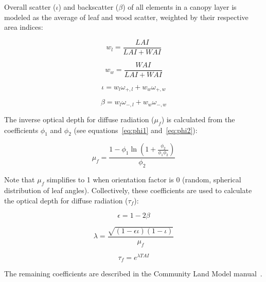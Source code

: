 Overall scatter ($\iota$) and backscatter ($\beta$) of all elements in a canopy layer is modeled as the average of leaf and wood scatter, weighted by their respective area indices:

\begin{equation}\label{eq:wl}
  w_l = \frac{LAI}{LAI + WAI}
\end{equation}

\begin{equation}\label{eq:ww}
  w_w = \frac{WAI}{LAI + WAI}
\end{equation}

\begin{equation}\label{eq:scatter}
  \iota = w_l \omega_{+,l} + w_w \omega_{+,w}
\end{equation}

\begin{equation}\label{eq:backscatter}
  \beta = w_l \omega_{-,l} + w_w \omega_{-,w}
\end{equation}

The inverse optical depth for diffuse radiation ($\mu_f$) is calculated from the coefficients $\phi_1$ and $\phi_2$ (see equations~\ref{eq:phi1} and~\ref{eq:phi2}):

\begin{equation}
   \mu_f = \frac{1 - \phi_1 \ln{(1 + \frac{\phi_2}{\phi_1 \phi_2})}}{\phi_2} 
\end{equation}

Note that $\mu_f$ simplifies to 1 when orientation factor is 0 (random, spherical distribution of leaf angles).
Collectively, these coefficients are used to calculate the optical depth for diffuse radiation ($\tau_f$):

\begin{equation}
  \epsilon = 1 - 2\beta
\end{equation}

\begin{equation}
  \lambda = \frac{\sqrt{(1 - \epsilon\iota) (1 - \iota)}}{\mu_f}
\end{equation}

\begin{equation}
  \tau_f = e ^ {\lambda TAI}
\end{equation}

The remaining coefficients are described in the Community Land Model manual~\cite{clm45_note}.

